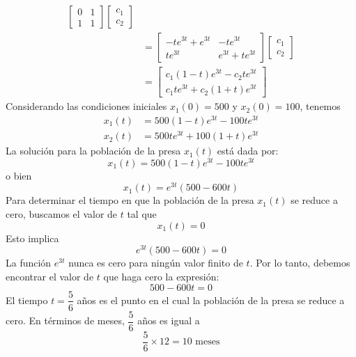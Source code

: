 \begin{example}
\begin{align*}
\begin{bmatrix}
            0 & 1 \\
            1 & 1
        \end{bmatrix} \begin{bmatrix}
            c_1 \\
            c_2
        \end{bmatrix} \\
        & = \begin{bmatrix}
            -te^{3t} + e^{3t} & -te^{3t} \\
            te^{3t} & e^{3t} + te^{3t}
        \end{bmatrix} \begin{bmatrix}
            c_1 \\
            c_2
        \end{bmatrix} \\
        & = \begin{bmatrix}
            c_1 (1 - t)e^{3t} - c_2 te^{3t} \\[1.1mm]
            c_1 t e^{3t} + c_2 (1 + t)e^{3t}
        \end{bmatrix}
    \end{align*}
    Considerando las condiciones iniciales $x_1(0) = 500$ y $x_2(0) = 100$, tenemos
    \begin{align*}
        x_1(t) & = 500(1 - t)e^{3t} - 100te^{3t} \\
        x_2(t) & = 500te^{3t} + 100(1 + t)e^{3t}
    \end{align*}
    La solución para la población de la presa $x_1(t)$ está dada por:
    $$x_1(t) = 500(1 - t)e^{3t} - 100te^{3t}$$
    o bien
    $$x_1(t) = e^{3t} (500 - 600t)$$
    Para determinar el tiempo en que la población de la presa \(x_1(t)\) se reduce a cero, buscamos el valor de \(t\) tal que
    $$x_1(t) = 0$$\newpage\noindent
    Esto implica
    $$e^{3t} (500 - 600t) = 0$$
    La función $e^{3t}$ nunca es cero para ningún valor finito de $t$. Por lo tanto, debemos encontrar el valor de $t$ que haga cero la expresión:
    $$500 - 600t = 0$$
    El tiempo $t = \dfrac{5}{6}$ años es el punto en el cual la población de la presa se reduce a cero. En términos de meses, $\dfrac{5}{6}$ años es igual a
    $$\frac{5}{6} \times 12 = 10 \text{ meses}$$
\end{example}

